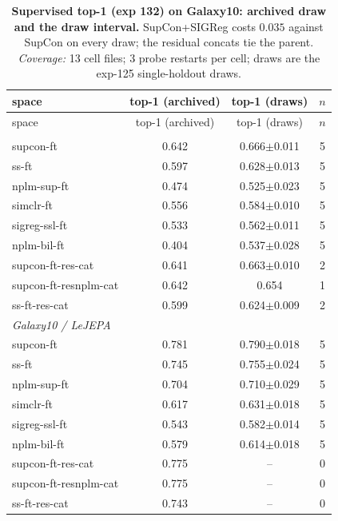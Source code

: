 \begin{center}
\footnotesize
\begin{longtable}{lccc}
\caption{\textbf{Supervised top-1 (exp 132) on Galaxy10: archived draw and the draw interval.} SupCon+SIGReg costs $0.035$ against SupCon on every draw; the residual concats tie the parent. \emph{Coverage:} 13 cell files; 3 probe restarts per cell; draws are the exp-125 single-holdout draws.}\label{tab:app_top1_galaxy}\\
\toprule
space & top-1 (archived) & top-1 (draws) & $n$ \\
\midrule
\endfirsthead
\toprule
space & top-1 (archived) & top-1 (draws) & $n$ \\
\midrule
\endhead
\bottomrule
\endfoot
\multicolumn{4}{l}{\emph{Galaxy10 / DINO}} \\
\quad supcon-ft & 0.642 & 0.666$\pm$0.011 & 5 \\
\quad ss-ft & 0.597 & 0.628$\pm$0.013 & 5 \\
\quad nplm-sup-ft & 0.474 & 0.525$\pm$0.023 & 5 \\
\quad simclr-ft & 0.556 & 0.584$\pm$0.010 & 5 \\
\quad sigreg-ssl-ft & 0.533 & 0.562$\pm$0.011 & 5 \\
\quad nplm-bil-ft & 0.404 & 0.537$\pm$0.028 & 5 \\
\quad supcon-ft-res-cat & 0.641 & 0.663$\pm$0.010 & 2 \\
\quad supcon-ft-resnplm-cat & 0.642 & 0.654 & 1 \\
\quad ss-ft-res-cat & 0.599 & 0.624$\pm$0.009 & 2 \\
\multicolumn{4}{l}{\emph{Galaxy10 / LeJEPA}} \\
\quad supcon-ft & 0.781 & 0.790$\pm$0.018 & 5 \\
\quad ss-ft & 0.745 & 0.755$\pm$0.024 & 5 \\
\quad nplm-sup-ft & 0.704 & 0.710$\pm$0.029 & 5 \\
\quad simclr-ft & 0.617 & 0.631$\pm$0.018 & 5 \\
\quad sigreg-ssl-ft & 0.543 & 0.582$\pm$0.014 & 5 \\
\quad nplm-bil-ft & 0.579 & 0.614$\pm$0.018 & 5 \\
\quad supcon-ft-res-cat & 0.775 & -- & 0 \\
\quad supcon-ft-resnplm-cat & 0.775 & -- & 0 \\
\quad ss-ft-res-cat & 0.743 & -- & 0 \\

\end{longtable}
\end{center}

